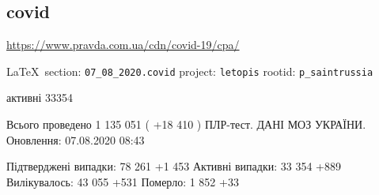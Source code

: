  
 
\subsection{covid}
\url{https://www.pravda.com.ua/cdn/covid-19/cpa/}

  
\vspace{0.5cm}
 {\ifDEBUG\small\LaTeX~section: \verb|07_08_2020.covid| project: \verb|letopis| rootid: \verb|p_saintrussia| \fi}
\vspace{0.5cm}

активні 33354

Всього проведено 1 135 051 ( +18 410 ) ПЛР-тест.
ДАНІ МОЗ УКРАЇНИ. Оновлення: 07.08.2020 08:43

Підтверджені випадки: 78 261 +1 453 Активні випадки: 33 354 +889 Вилікувалось:
43 055 +531 Померло: 1 852 +33
  
